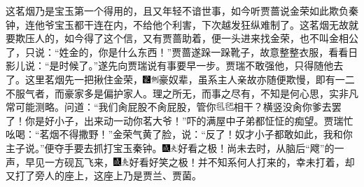 这茗烟乃是宝玉第一个得用的，且又年轻不谙世事，如今听贾蔷说金荣如此欺负秦钟，连他爷宝玉都干连在内，不给他个利害，下次越发狂纵难制了。这茗烟无故就要欺压人的，如今得了这个信，又有贾蔷助着，便一头进来找金荣，也不叫金相公了，只说：“姓金的，你是什么东西！”贾蔷遂跺一跺靴子，故意整整衣服，看看日影儿说：“是时候了。”遂先向贾瑞说有事要早一步。贾瑞不敢强他，只得随他去了。这里茗烟先一把揪住金荣，{\includegraphics[width=3mm]{../Images/00006}\includegraphics[width=3mm]{../Images/00011}\footnotesize \kaishu 豪奴辈，虽系主人亲故亦随便欺慢，即有一二不服气者，而豪家多是偏护家人。理之所无，而事之尽有，不知是何心思，实非凡常可能测略。}问道：“我们肏屁股不肏屁股，管你\includegraphics[width=18.8pt,height=9.4pt,align=c,vshift=1pt]{../images/00022}相干？横竖没肏你爹去罢了！你是好小子，出来动一动你茗大爷！”吓的满屋中子弟都怔怔的痴望。贾瑞忙吆喝：“茗烟不得撒野！”金荣气黄了脸，说：“反了！奴才小子都敢如此，我和你主子说。”便夺手要去抓打宝玉秦钟。{\includegraphics[width=3mm]{../Images/00005}\includegraphics[width=3mm]{../Images/00012}\footnotesize \kaishu 好看之极！}尚未去时，从脑后“飕”的一声，早见一方砚瓦飞来，{\includegraphics[width=3mm]{../Images/00005}\includegraphics[width=3mm]{../Images/00012}\footnotesize \kaishu 好看好笑之极！}并不知系何人打来的，幸未打着，却又打了旁人的座上，这座上乃是贾兰、贾菌。

